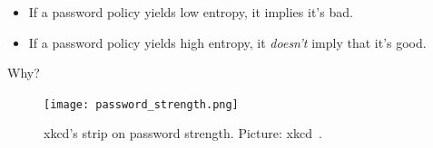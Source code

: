 \begin{frame}
  \begin{remark}
    \begin{itemize}
      \item If a password policy yields low entropy, it implies it's bad.
      \item If a password policy yields high entropy, it \emph{doesn't} imply 
        that it's good.
    \end{itemize}
  \end{remark}

  \pause

  \begin{exercise}
    Why?
  \end{exercise}
\end{frame}

\begin{frame}
  \begin{figure}
    \texttt{[image: password\_strength.png]}
    \caption{xkcd's strip on password strength.
    Picture: xkcd~\cite{xkcd936}.}
  \end{figure}
\end{frame}

%
%
%
%
%
%
%

